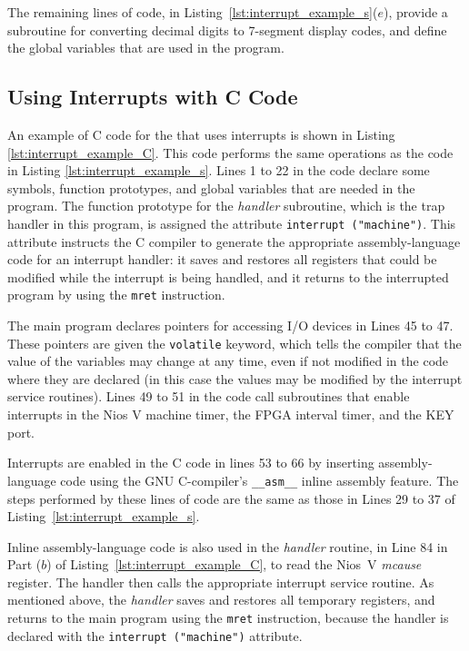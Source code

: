 The remaining lines of code, in Listing~\ref{lst:interrupt_example_s}($e$),
provide a subroutine for converting decimal digits to 7-segment display codes,
and define the global variables that are used in the program.

\subsection{Using Interrupts with C Code}

An example of C code for the {\it \systemNameFull} that uses interrupts is shown in 
Listing \ref{lst:interrupt_example_C}. This code performs the same operations as
the code in Listing \ref{lst:interrupt_example_s}. Lines 1 to 22 in the code declare some symbols, 
function prototypes, and global variables that are needed in the program. The function
prototype for the {\it handler} subroutine, which is the trap handler in this program, is
assigned the attribute \texttt{interrupt ("machine")}. This attribute instructs the C compiler 
to generate the appropriate assembly-language code for an interrupt handler: it saves and 
restores all registers that could be modified while the interrupt is being handled, and it 
returns to the interrupted program by using the \texttt{mret} instruction. 

The main program declares pointers for accessing I/O devices in Lines 45 to 47. These
pointers are given the \texttt{volatile} keyword, which tells the compiler that the
value of the variables may change at any time, even if not modified in the code where
they are declared (in this case the values may be modified by the interrupt service routines). 
Lines 49 to 51 in the code call subroutines that enable interrupts in the Nios V machine
timer, the FPGA interval timer, and the KEY port. 

Interrupts are enabled in the C code in lines 53 to 66 by inserting assembly-language code 
using the GNU C-compiler's \texttt{\_\_asm\_\_} inline assembly feature. The steps performed by
these lines of code are the same as those in Lines 29 to 37 of 
Listing~\ref{lst:interrupt_example_s}.

Inline assembly-language code is also used in the {\it handler} routine, in Line 84 in 
Part ($b$) of Listing~\ref{lst:interrupt_example_C}, to read the Nios~V {\it mcause} register.
The handler then calls the appropriate interrupt service routine. As mentioned above, the
{\it handler} saves and restores all temporary registers, and returns to the main program 
using the \texttt{mret} instruction, because the
handler is declared with the \texttt{interrupt ("machine")} attribute.

